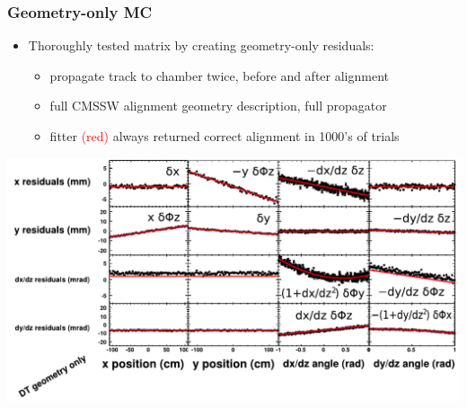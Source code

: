 \documentclass[compress]{beamer}
\begin{document}
\begin{frame}
\frametitle{Geometry-only MC}

\begin{itemize}
\item Thoroughly tested matrix by creating geometry-only residuals:
\begin{itemize}
\item propagate track to chamber twice, before and after alignment
\item full CMSSW alignment geometry description, full propagator
\item fitter \textcolor{red}{(red)} always returned correct alignment in 1000's of trials
\end{itemize}
\end{itemize}

\includegraphics[width=\linewidth]{geometryonly_dt.pdf}
\end{frame}
\end{document}
